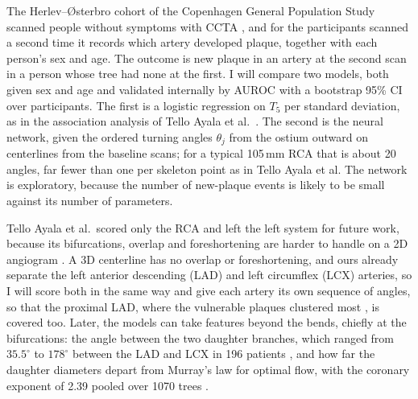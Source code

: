 The Herlev--{\O}sterbro cohort of the Copenhagen General Population Study scanned people without
symptoms with CCTA \cite{fuchs2023cgps}, and for the participants scanned a second time it records
which artery developed plaque, together with each person's sex and age.
The outcome is new plaque in an artery at the second scan in a person whose tree had none at the first.
I will compare two models, both given sex and age and validated internally by AUROC with a
bootstrap 95\% CI over participants.
The first is a logistic regression on $T_5$ per standard deviation, as in the association analysis
of Tello Ayala et al.\ \cite{tello2026tortuosity}.
The second is the neural network, given the ordered turning angles $\theta_j$ from the ostium
outward on centerlines from the baseline scans; for a typical 105\,mm RCA that is about 20 angles,
far fewer than one per skeleton point as in Tello Ayala et al.
The network is exploratory, because the number of new-plaque events is likely to be small against
its number of parameters.

Tello Ayala et al.\ scored only the RCA and left the left system for future work, because its
bifurcations, overlap and foreshortening are harder to handle on a 2D angiogram
\cite{tello2026tortuosity}.
A 3D centerline has no overlap or foreshortening, and ours already separate the left anterior descending
(LAD) and left circumflex (LCX) arteries, so I will score both in the same way and give each artery
its own sequence of angles, so that the proximal LAD, where the vulnerable plaques clustered most
\cite{araki2020plaques}, is covered too.
Later, the models can take features beyond the bends, chiefly at the bifurcations: the angle
between the two daughter branches, which ranged from $35.5^\circ$ to $178^\circ$ between the LAD and
LCX in 196 patients \cite{temov2016bifurcation}, and how far the daughter diameters depart from
Murray's law for optimal flow, with the coronary exponent of 2.39 pooled over 1070 trees
\cite{taylor2024murray}.
